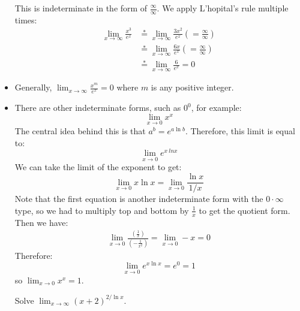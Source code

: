 \begin{itemize}
\begin{example}
        This is indeterminate in the form of $\frac{\infty}{\infty}$. We apply L'hopital's rule multiple times:
        \begin{align}
            \lim_{x\to \infty} \frac{x^3}{e^x} &\stackrel{*}{=} \lim_{x\to\infty} \frac{3x^2}{e^x} \left(=\frac{\infty}{\infty}\right) \\ 
            &\stackrel{*}{=} \lim_{x\to \infty} \frac{6x}{e^x} \left(=\frac{\infty}{\infty}\right) \\ 
            &\stackrel{*}{=} \lim_{x\to \infty} \frac{6}{e^x} = 0
        \end{align}
    \end{example}
    \item Generally, $\lim_{x\to \infty} \frac{x^m}{e^x} = 0$ where $m$ is any positive integer.
    \item There are other indeterminate forms, such as $0^0$, for example:
    \begin{equation}
        \lim_{x\to 0} x^x
    \end{equation}
    The central idea behind this is that $a^b = e^{a\ln b}$. Therefore, this limit is equal to:
    \begin{equation}
        \lim_{x\to 0} e^{x\ ln x}
    \end{equation}
    We can take the limit of the exponent to get:
    \begin{equation}
        \lim_{x\to 0} x\ln x = \lim_{x\to 0} \frac{\ln x}{1/x}
    \end{equation}
    Note that the first equation is another indeterminate form with the $0 \cdot \infty$ type, so we had to multiply top and bottom by $\frac{1}{x}$ to get the quotient form. Then we have:
    \begin{align}
        \lim_{x\to 0} \frac{\left(\frac{1}{x}\right)}{\left(-\frac{1}{x^2}\right)}=\lim_{x\to 0} -x = 0
    \end{align}
    Therefore:
    \begin{equation}
        \lim_{x\to 0} e^{x\ln x} = e^ 0 = 1
    \end{equation}
    so $\lim_{x\to 0} x^x = 1$.
    \begin{example}
        Solve $\lim_{x\to \infty}(x+2)^{2/\ln x}$.
        \vspace{2mm}


\end{example}
\end{itemize}
